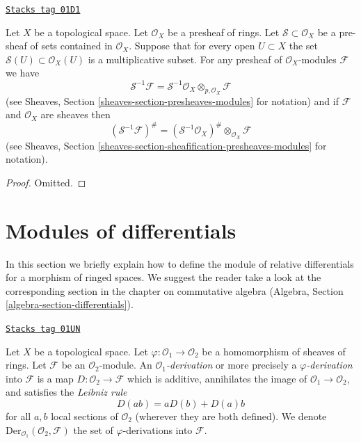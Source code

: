 \begin{lemma}
\label{modules-lemma-simple-invert-module}
\href{https://stacks.math.columbia.edu/tag/01D1}{\texttt{Stacks tag 01D1}}

Let $X$ be a topological space.
Let $\mathcal{O}_X$ be a presheaf of rings.
Let $\mathcal{S} \subset \mathcal{O}_X$ be a pre-sheaf of sets contained
in $\mathcal{O}_X$. Suppose that for every open $U \subset X$ the set
$\mathcal{S}(U) \subset \mathcal{O}_X(U)$ is a multiplicative subset.
For any presheaf of $\mathcal{O}_X$-modules $\mathcal{F}$ we
have
$$
\mathcal{S}^{-1}\mathcal{F}
=
\mathcal{S}^{-1}\mathcal{O}_X \otimes_{p, \mathcal{O}_X} \mathcal{F}
$$
(see Sheaves, Section \ref{sheaves-section-presheaves-modules} for notation)
and if $\mathcal{F}$ and $\mathcal{O}_X$ are sheaves then
$$
(\mathcal{S}^{-1}\mathcal{F})^\#
=
(\mathcal{S}^{-1}\mathcal{O}_X)^\# \otimes_{\mathcal{O}_X} \mathcal{F}
$$
(see Sheaves, Section \ref{sheaves-section-sheafification-presheaves-modules}
for notation).
\end{lemma}

\begin{proof}
Omitted.
\end{proof}

\section{Modules of differentials}
\label{modules-section-differentials}
In this section we briefly explain how to define the module of relative
differentials for a morphism of ringed spaces. We suggest the reader take
a look at the corresponding section in the chapter on commutative algebra
(Algebra, Section \ref{algebra-section-differentials}).

\begin{definition}[Derivation]
\label{modules-definition-derivation}
\href{https://stacks.math.columbia.edu/tag/01UN}{\texttt{Stacks tag 01UN}}

Let $X$ be a topological space. Let $\varphi : \mathcal{O}_1 \to \mathcal{O}_2$
be a homomorphism of sheaves of rings. Let $\mathcal{F}$ be an
$\mathcal{O}_2$-module. An {\it $\mathcal{O}_1$-derivation} or more precisely
a {\it $\varphi$-derivation} into $\mathcal{F}$ is a map
$D : \mathcal{O}_2 \to \mathcal{F}$ which is additive, annihilates the image
of $\mathcal{O}_1 \to \mathcal{O}_2$, and satisfies the
{\it Leibniz rule}
$$
D(ab) = aD(b) + D(a)b
$$
for all $a, b$ local sections of $\mathcal{O}_2$ (wherever they are both
defined). We denote $\text{Der}_{\mathcal{O}_1}(\mathcal{O}_2, \mathcal{F})$
the set of $\varphi$-derivations into $\mathcal{F}$.
\end{definition}

